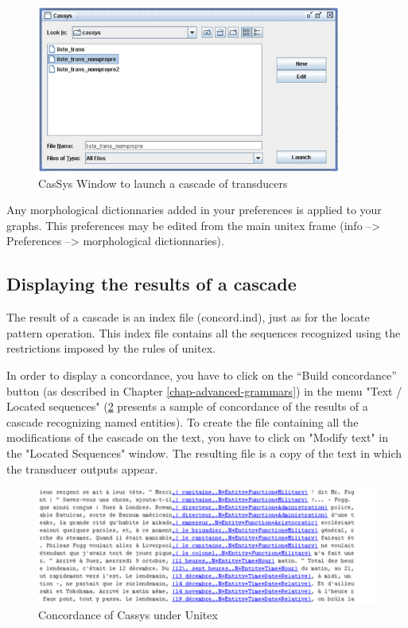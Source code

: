 \begin{figure}[!htb]
  \centering
  \includegraphics[width=10cm]{resources/img/fig13-02.png}
  \caption{CasSys Window to launch a cascade of transducers}
  \label{fig13-02}
\end{figure}


Any morphological dictionnaries added in your preferences is applied to your
graphs. This preferences may be edited from the main unitex frame (info -->
Preferences --> morphological dictionnaries).

\subsection{Displaying the results of a cascade}
\label{subsec:resultsCascade}

The result of a cascade is an index file (concord.ind), just as for the locate pattern operation. This index file contains all the sequences recognized using the restrictions imposed by the rules of unitex.

\bigskip
\noindent In order to display a concordance, you have to click on the "`Build concordance"' button (as described in Chapter \ref{chap-advanced-grammars}) 
in the menu "Text / Located sequences" (\ref{fig13-04} presents a sample of concordance of the results of a cascade recognizing named entities).
To create the file containing all the modifications of the cascade on the text, you have to click on "Modify text" in the "Located Sequences" window.
 The resulting file is a copy of the text in which the transducer outputs appear.

\begin{figure}[!htb]
  \centering
  \includegraphics[width=14cm]{resources/img/fig13-04.png}
  \caption{Concordance of Cassys under Unitex}
  \label{fig13-04}
\end{figure}

